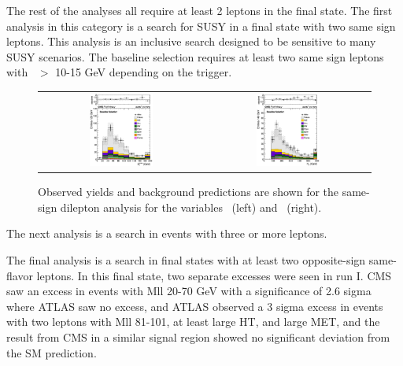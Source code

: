
The rest of the analyses all require at least 2 leptons in the final state.
The first analysis in this category is a search for SUSY in a final state with two same sign leptons.
This analysis is an inclusive search designed to be sensitive to many SUSY scenarios.
The baseline selection requires at least two same sign leptons with \pt\ $>$ 10-15 GeV depending on the trigger.

\begin{figure}[!htb]
\begin{center}
\begin{tabular}{cc}
\includegraphics[width=0.4\textwidth]{2lepss/SS_MET.pdf} &
\includegraphics[width=0.4\textwidth]{2lepss/SS_HT.pdf}
\end{tabular}
\caption{
\label{fig:2lepssresults}
Observed yields and background predictions are shown for the same-sign dilepton analysis
for the variables \MET\ (left) and \HT\ (right).
}
\end{center}
\end{figure}


The next analysis is a search in events with three or more leptons.

The final analysis is a search in final states with at least two opposite-sign same-flavor leptons.
In this final state, two separate excesses were seen in run I.
CMS saw an excess in events with Mll 20-70 GeV with a significance of 2.6 sigma where ATLAS saw no excess,
and ATLAS observed a 3 sigma excess in events with two leptons with Mll 81-101, at least large HT, and large MET,
and the result from CMS in a similar signal region showed no significant deviation from the SM prediction.
